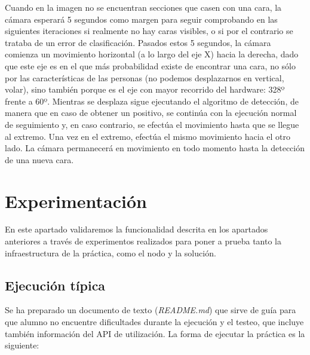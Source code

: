 Cuando en la imagen no se encuentran secciones que casen con una cara, la cámara esperará 5 segundos como margen para seguir comprobando en las siguientes iteraciones si realmente no hay caras visibles, o si por el contrario se trataba de un error de clasificación. Pasados estos 5 segundos, la cámara comienza un movimiento horizontal (a lo largo del eje X) hacia la derecha, dado que este eje es en el que más probabilidad existe de encontrar una cara, no sólo por las características de las personas (no podemos desplazarnos en vertical, volar), sino también porque es el eje con mayor recorrido del hardware: 328º frente a 60º. Mientras se desplaza sigue ejecutando el algoritmo de detección, de manera que en caso de obtener un positivo, se continúa con la ejecución normal de seguimiento y, en caso contrario, se efectúa el movimiento hasta que se llegue al extremo. Una vez en el extremo, efectúa el mismo movimiento hacia el otro lado. La cámara permanecerá en movimiento en todo momento hasta la detección de una nueva cara.

\section{Experimentación}
En este apartado validaremos la funcionalidad descrita en los apartados anteriores a través de experimentos realizados para poner a prueba tanto la infraestructura de la práctica, como el nodo y la solución.

\subsection{Ejecución típica}
Se ha preparado un documento de texto (\textit{README.md}) que sirve de guía para que alumno no encuentre dificultades durante la ejecución y el testeo, que incluye también información del API de utilización. La forma de ejecutar la práctica es la siguiente:

